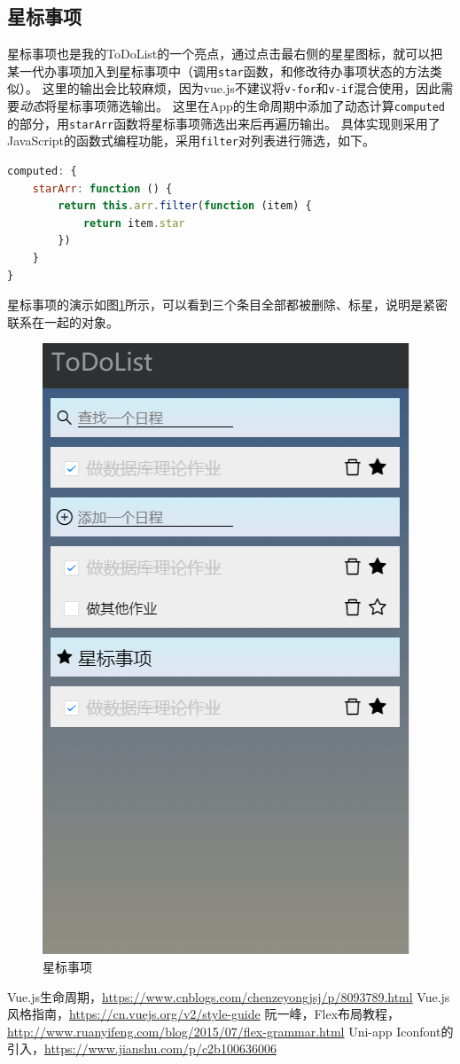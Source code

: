 \documentclass[logo,reportComp]{thesis}
\begin{document}
\subsection{星标事项}
星标事项也是我的ToDoList的一个亮点，通过点击最右侧的星星图标，就可以把某一代办事项加入到星标事项中（调用\verb'star'函数，和修改待办事项状态的方法类似）。
这里的输出会比较麻烦，因为vue.js不建议将\verb'v-for'和\verb'v-if'混合使用，因此需要\emph{动态}将星标事项筛选输出。
这里在App的生命周期中添加了动态计算\verb'computed'的部分，用\verb'starArr'函数将星标事项筛选出来后再遍历输出。
具体实现则采用了JavaScript的函数式编程功能，采用\verb'filter'对列表进行筛选，如下。
\begin{lstlisting}[language=JavaScript]
computed: {
	starArr: function () {
		return this.arr.filter(function (item) {
			return item.star
		})
	}
}
\end{lstlisting}

星标事项的演示如图\ref{fig:star}所示，可以看到三个条目全部都被删除、标星，说明是紧密联系在一起的对象。
\begin{figure}[H]
\centering
\includegraphics[width=0.4\linewidth]{fig/star.png}
\caption{星标事项}
\label{fig:star}
\end{figure}

\begin{thebibliography}{99}
 Vue.js生命周期，\url{https://www.cnblogs.com/chenzeyongjsj/p/8093789.html}
 Vue.js风格指南，\url{https://cn.vuejs.org/v2/style-guide}
 阮一峰，Flex布局教程，\url{http://www.ruanyifeng.com/blog/2015/07/flex-grammar.html}
 Uni-app Iconfont的引入，\url{https://www.jianshu.com/p/c2b100636006}
\end{thebibliography}
\end{document}
